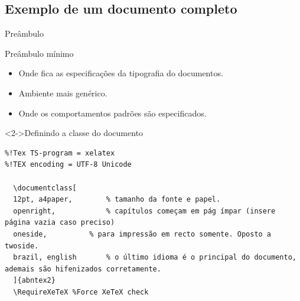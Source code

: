 \documentclass[bigger]{beamer}
\begin{document}
{\subsection{Exemplo de um documento completo}
\label{sec:org9a9da40}
\begin{frame}[label={sec:orgf3cbaca},fragile]{Preâmbulo}
 \begin{block}{Preâmbulo mínimo}
\begin{itemize}
\item Onde fica as especificações da tipografia do documentos.
\item Ambiente mais genérico.
\item Onde os comportamentos padrões são especificados.
\end{itemize}
\end{block}

\begin{block}<2->{Definindo a classe do documento}
\begin{verbatim}
%!Tex TS-program = xelatex
%!TEX encoding = UTF-8 Unicode

  \documentclass[
  12pt, a4paper,		% tamanho da fonte e papel.
  openright,			% capítulos começam em pág ímpar (insere página vazia caso preciso)
  oneside,			% para impressão em recto somente. Oposto a twoside.
  brazil, english		% o último idioma é o principal do documento, ademais são hifenizados corretamente.
  ]{abntex2}
  \RequireXeTeX %Force XeTeX check
\end{verbatim}
\end{block}
\end{frame}

}
\end{document}
